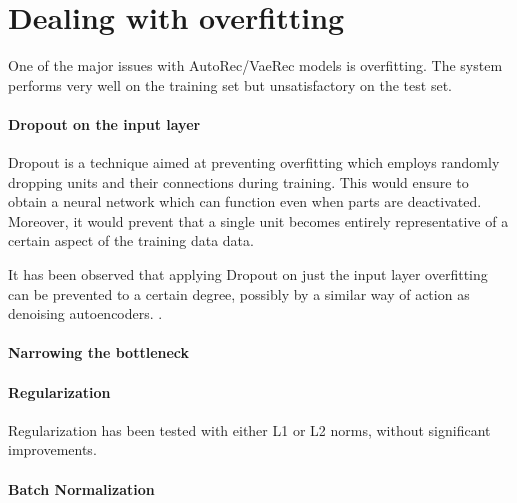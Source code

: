 \section{Dealing with overfitting}

One of the major issues with AutoRec/VaeRec models
is overfitting. The system performs very well on the training
set but unsatisfactory on the test set.

\paragraph{Dropout on the input layer}
Dropout \cite{Srivastava2014}
is a technique aimed at preventing overfitting
which employs randomly dropping units
and their connections
during training.
This would ensure to obtain a neural network
which can function even when parts are deactivated.
Moreover, it would prevent that a single unit becomes
entirely representative of a certain aspect of the training data
data.

It has been observed that applying Dropout on just the input layer
overfitting can be prevented to a certain degree,
possibly by a similar way of action as denoising autoencoders.
\cite{Vincent2010}.

\paragraph{Narrowing the bottleneck}
\paragraph{Regularization}
Regularization has been tested with either L1 or L2 norms,
without significant improvements.
\paragraph{Batch Normalization}
